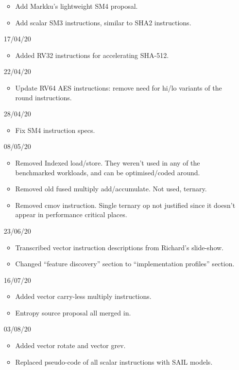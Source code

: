 \begin{itemize}
\begin{itemize}
    \item Add Markku's lightweight SM4 proposal.
    \item Add scalar SM3 instructions, similar to SHA2 instructions.
\end{itemize}
\item[17/04/20] \begin{itemize}
    \item Added RV32 instructions for accelerating SHA-512.
\end{itemize}
\item[22/04/20] \begin{itemize}
    \item Update RV64 AES instructions: remove need for hi/lo variants of
          the round instructions.
\end{itemize}
\item[28/04/20] \begin{itemize}
    \item Fix SM4 instruction specs. 
\end{itemize}
\item[08/05/20] \begin{itemize}
    \item Removed Indexed load/store. They weren't used in any of the
          benchmarked workloads, and can be optimised/coded around.
    \item Removed old fused multiply add/accumulate. Not used, ternary.
    \item Removed cmov instruction. Single ternary op not justified since
          it doesn't appear in performance critical places.
\end{itemize}
\item[23/06/20] \begin{itemize}
    \item Transcribed vector instruction descriptions from Richard's
          slide-show.
    \item Changed ``feature discovery'' section to
          ``implementation profiles'' section.
\end{itemize}
\item[16/07/20] \begin{itemize}
    \item Added vector carry-less multiply instructions.
    \item Entropy source proposal all merged in.
\end{itemize}
\item[03/08/20] \begin{itemize}
    \item Added vector rotate and vector grev.
    \item Replaced pseudo-code of all scalar instructions with SAIL models.
\end{itemize}
\end{itemize}
